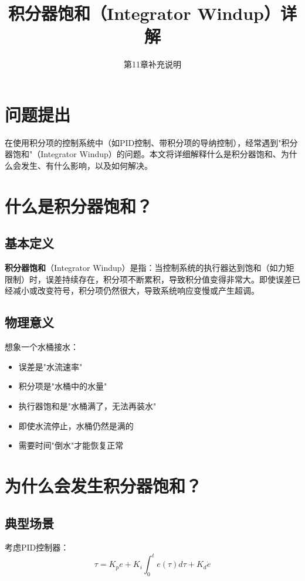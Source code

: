 \documentclass[12pt,a4paper]{article}
\title{积分器饱和（Integrator Windup）详解}
\author{第11章补充说明}
\date{}
\begin{document}
\maketitle

\section{问题提出}

在使用积分项的控制系统中（如PID控制、带积分项的导纳控制），经常遇到"积分器饱和"（Integrator Windup）的问题。本文将详细解释什么是积分器饱和、为什么会发生、有什么影响，以及如何解决。

\section{什么是积分器饱和？}

\subsection{基本定义}

\textbf{积分器饱和}（Integrator Windup）是指：当控制系统的执行器达到饱和（如力矩限制）时，误差持续存在，积分项不断累积，导致积分值变得非常大。即使误差已经减小或改变符号，积分项仍然很大，导致系统响应变慢或产生超调。

\subsection{物理意义}

想象一个水桶接水：
\begin{itemize}
\item 误差是"水流速率"
\item 积分项是"水桶中的水量"
\item 执行器饱和是"水桶满了，无法再装水"
\item 即使水流停止，水桶仍然是满的
\item 需要时间"倒水"才能恢复正常
\end{itemize}

\section{为什么会发生积分器饱和？}

\subsection{典型场景}

考虑PID控制器：
\begin{equation}
\tau = K_p e + K_i \int_0^t e(\tau) d\tau + K_d \dot{e}
\end{equation}
\end{document}
